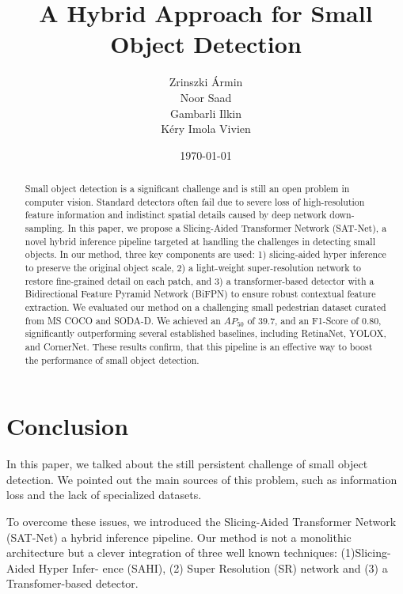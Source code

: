 \documentclass[12pt, a4paper]{article}
\title{A Hybrid Approach for Small Object Detection}
\author{
    Zrinszki Ármin \\
    Noor Saad \\
    Gambarli Ilkin \\
    Kéry Imola Vivien
}
\date{\today}
\begin{document}
\maketitle
\thispagestyle{empty}

\begin{abstract}
    Small object detection is a significant challenge and is still an open problem in computer vision. Standard detectors often fail due to severe loss of high-resolution feature information and indistinct spatial details caused by deep network down-sampling. In this paper, we propose a Slicing-Aided Transformer Network (SAT-Net), a novel hybrid inference pipeline targeted at handling the challenges in detecting small objects. In our method, three key components are used: 1) slicing-aided hyper inference to preserve the original object scale, 2) a light-weight super-resolution network to restore fine-grained detail on each patch, and 3) a transformer-based detector with a Bidirectional Feature Pyramid Network (BiFPN) to ensure robust contextual feature extraction. We evaluated our method on a challenging small pedestrian dataset curated from MS COCO and SODA-D. We achieved an $AP_{50}$ of $39.7$, and an F1-Score of $0.80$, significantly outperforming several established baselines, including RetinaNet, YOLOX, and CornerNet. These results confirm, that this pipeline is an effective way to boost the performance of small object detection.
\end{abstract}

\newpage
\tableofcontents
\newpage






\section{Conclusion}
\label{sec:conclusion}

In this paper, we talked about the still persistent challenge of small object detection. We pointed out the main sources of this problem, such as information loss and the lack of specialized datasets.

To overcome these issues, we introduced the Slicing-Aided Transformer Network (SAT-Net) a hybrid inference pipeline. Our method is not a monolithic architecture but a clever integration of three well known techniques: (1)Slicing-Aided Hyper Infer-
ence (SAHI), (2) Super Resolution (SR) network and (3) a Transfomer-based detector.
\end{document}

